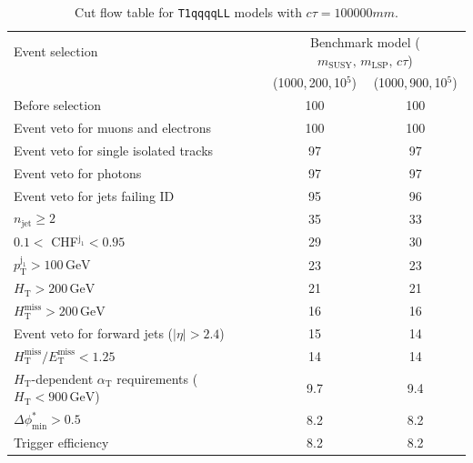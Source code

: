 \begin{table}[!h]
  \caption{Cut flow table for \texttt{T1qqqqLL} models with $c\tau = 100000\unit{mm}$.} 
  \label{tab:cut_flow_ctau_100000}
{\scriptsize%
\centering
\begin{tabular}{lcc}
  \hline
  Event selection & \multicolumn{2}{c}{Benchmark model ($m_\mathrm{SUSY},\,m_\mathrm{LSP},\,c\tau$)} \\
  \cline{2-3}
    & (1000,\,200,\,10$^5$) & (1000,\,900,\,10$^5$) \\
  \hline
  Before selection  & 100\phantom{.1} & 100\phantom{.1} \\
  Event veto for muons and electrons & 100\phantom{.1} & 100\phantom{.1} \\
  Event veto for single isolated tracks & \phantom{1}97\phantom{.1} & \phantom{1}97\phantom{.1} \\
  Event veto for photons & \phantom{1}97\phantom{.1} & \phantom{1}97\phantom{.1} \\
  Event veto for jets failing ID & \phantom{1}95\phantom{.1} & \phantom{1}96\phantom{.1} \\
   $n_{\mathrm{jet}} \geq 2$  & \phantom{1}35\phantom{.1} & \phantom{1}33\phantom{.1} \\
   $0.1 <$ CHF$^{\mathrm{j_1}} < 0.95$ & \phantom{1}29\phantom{.1} & \phantom{1}30\phantom{.1} \\
   $p_{\mathrm{T}}^{\mathrm{j_1}} > 100\,\mathrm{GeV}$ & \phantom{1}23\phantom{.1} & \phantom{1}23\phantom{.1} \\
   $H_{\mathrm{T}} > 200\,\mathrm{GeV}$  & \phantom{1}21\phantom{.1} & \phantom{1}21\phantom{.1} \\
  $H_{\mathrm{T}}^{\mathrm{miss}} > 200\,\mathrm{GeV}$  & \phantom{1}16\phantom{.1} & \phantom{1}16\phantom{.1} \\
  Event veto for forward jets ($|\eta| > 2.4$) & \phantom{1}15\phantom{.1} & \phantom{1}14\phantom{.1} \\
  $H_{\mathrm{T}}^{\mathrm{miss}} / E_{\mathrm{T}}^{\mathrm{miss}} < 1.25$ & \phantom{1}14\phantom{.1} & \phantom{1}14\phantom{.1} \\
  $H_{\mathrm{T}}$-dependent $\alpha_{\mathrm{T}}$ requirements ($H_{\mathrm{T}} < 900\,\mathrm{GeV}$)  &  \phantom{10}9.7 & \phantom{10}9.4 \\
  $\Delta\phi^{*}_{\mathrm{min}} > 0.5$  & \phantom{10}8.2 & \phantom{10}8.2 \\
  Trigger efficiency &  \phantom{10}8.2 &  \phantom{10}8.2 \\
  \hline
\end{tabular}
}
\end{table}


